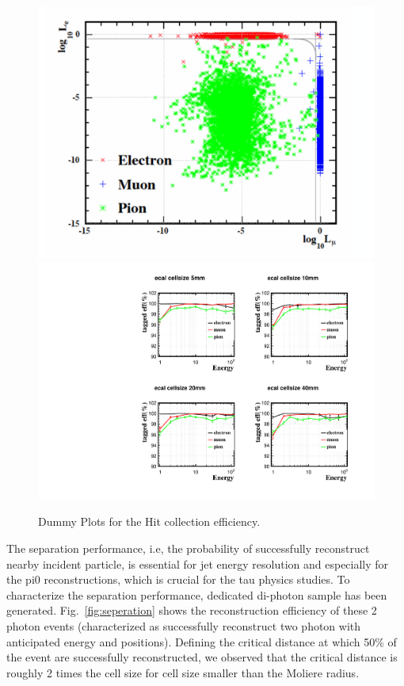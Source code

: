 \begin{figure}[h!]
\centering
\includegraphics[scale=0.22]{Figures/Performance/dan/2dlikeness.pdf}
\includegraphics[scale=0.30]{Figures/Performance/dan/eff_ES.pdf}
\caption{Dummy Plots for the Hit collection efficiency. }
\label{fig:performance-hit-level}
\end{figure}


The separation performance, i.e, the probability of successfully reconstruct nearby incident particle,
is essential for jet energy resolution and especially for the pi0 reconstructions, which is crucial for the tau physics studies.
To characterize the separation performance, dedicated di-photon sample has been generated.
Fig.~\ref{fig:seperation} shows the reconstruction efficiency of these 2 photon events
(characterized as successfully reconstruct two photon with anticipated energy and positions).
Defining the critical distance at which 50\% of the event are successfully reconstructed,
we observed that the critical distance is roughly 2 times the cell size for cell size smaller than the Moliere radius. 

